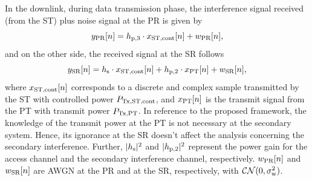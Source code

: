In the downlink, during data transmission phase, the interference signal received (from the ST) plus noise signal at the PR is given by
\begin{equation}
y_{\text{PR}}[n] = h_{\text{p,3}}  \cdot x_{\text{ST,cont}}[n] + w_{\text{PR}}[n],
\label{eq_US:sys_mod_pr}
\end{equation}
and on the other side, the received signal at the SR follows 
\begin{equation}
y_{\text{SR}}[n] = h_{\text{s}} \cdot x_{\text{ST,cont}}[n] + h_{\text{p,2}} \cdot x_{\text{PT}}[n] + w_{\text{SR}}[n],
\label{eq_US:sys_mod_sr}
\end{equation}
where $x_{\text{ST,cont}}[n]$ corresponds to a discrete and complex sample transmitted by the ST with controlled power $P_{\text{Tx,ST,cont}}$, and $x_{\text{PT}}[n]$ is the transmit signal from the PT with transmit power $P_{\text{Tx,PT}}$. In reference to the proposed framework, the knowledge of the transmit power at the PT is not necessary at the secondary system. Hence, its ignorance at the SR doesn't affect the analysis concerning the secondary interference. Further, $|h_{\text{s}}|^2$ and $|h_{\text{p,2}}|^2$ represent the power gain for the access channel and the secondary interference channel, respectively. $w_{\text{PR}}[n]$ and $w_{\text{SR}}[n]$ are AWGN at the PR and at the SR, respectively, with $\mathcal{CN}(0, \sigma^2_{\text{w}})$.%


